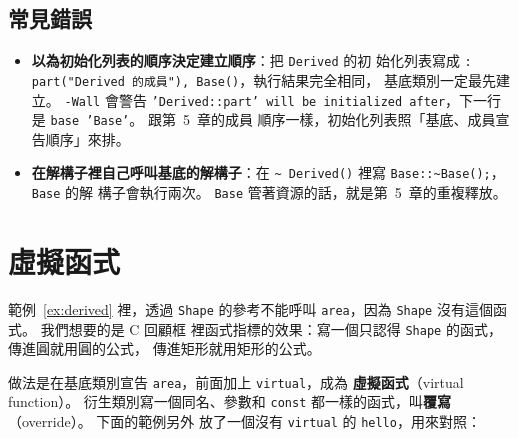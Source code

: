 \subsection{常見錯誤}

\begin{itemize}
\item \textbf{以為初始化列表的順序決定建立順序}：把 \texttt{Derived} 的初
始化列表寫成 \texttt{: part("Derived 的成員"), Base()}，執行結果完全相同，
基底類別一定最先建立。 \texttt{-Wall} 會警告 \texttt{'Derived::part' will
be initialized after}，下一行是 \texttt{base 'Base'}。 跟第~5~章的成員
順序一樣，初始化列表照「基底、成員宣告順序」來排。
\item \textbf{在解構子裡自己呼叫基底的解構子}：在 \texttt{\textasciitilde
Derived()} 裡寫 \texttt{Base::\textasciitilde Base();}，\texttt{Base} 的解
構子會執行兩次。 \texttt{Base} 管著資源的話，就是第~5~章的重複釋放。
\end{itemize}

\section{虛擬函式}
\label{sec:virtual}

範例~\ref{ex:derived} 裡，透過 \texttt{Shape} 的參考不能呼叫
\texttt{area}，因為 \texttt{Shape} 沒有這個函式。 我們想要的是 C 回顧框
裡函式指標的效果：寫一個只認得 \texttt{Shape} 的函式，傳進圓就用圓的公式，
傳進矩形就用矩形的公式。

做法是在基底類別宣告 \texttt{area}，前面加上 \texttt{virtual}，成為
\textbf{虛擬函式}（virtual function）。 衍生類別寫一個同名、參數和
\texttt{const} 都一樣的函式，叫\textbf{覆寫}（override）。 下面的範例另外
放了一個沒有 \texttt{virtual} 的 \texttt{hello}，用來對照：

